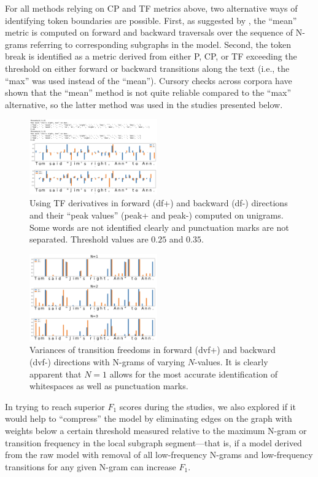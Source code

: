 \documentclass[11pt]{article}
\begin{document}
For all methods relying on CP and TF metrics above, two alternative ways of identifying token boundaries are possible. First, as suggested by \citet{12}, the “mean” metric is computed on forward and backward traversals over the sequence of N-grams referring to corresponding subgraphs in the model. Second, the token break is identified as a metric derived from either P, CP, or TF exceeding the threshold on either forward or backward transitions along the text (i.e.,  the “max” was used instead of the “mean”). Cursory checks across corpora have shown that the “mean” method is not quite reliable compared to the “max” alternative, so the latter method was used in the studies presented below.

\begin{figure}[!ht]
  \includegraphics[width=0.49\textwidth]{emnlp2022/imgs/figure4.png}
  \caption{Using TF derivatives in forward (df+) and backward (df-) directions and their “peak values” (peak+ and peak-) computed on unigrams. Some words are not identified clearly and punctuation marks are not separated. Threshold values are $0.25$ and $0.35$.}
\end{figure}

\begin{figure}[!ht]
  \includegraphics[width=0.49\textwidth]{emnlp2022/imgs/figure5.png}
  \caption{Variances of transition freedoms in forward (dvf+) and backward (dvf-) directions with N-grams of varying $N$-values. It is clearly apparent that $N=1$ allows for the most accurate identification of whitespaces as well as punctuation marks.}
\end{figure}

In trying to reach superior $F_1$ scores during the studies, we also explored if it would help to “compress” the model by eliminating edges on the graph with weights below a certain threshold measured relative to the maximum N-gram or transition frequency in the local subgraph segment—that is, if a model derived from the raw model with removal of all low-frequency N-grams and low-frequency transitions for any given N-gram can increase $F_1$.
\end{document}
